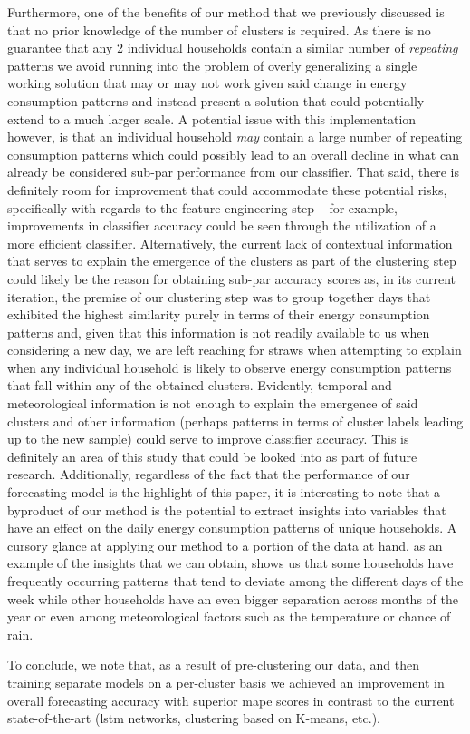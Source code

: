 \noindent \newline Furthermore, one of the benefits of our method that we previously discussed is that no prior knowledge of the number of clusters is required. As there is no guarantee that any 2 individual households contain a similar number of \textit{repeating} patterns we avoid running into the problem of overly generalizing a single working solution that may or may not work given said change in energy consumption patterns and instead present a solution that could potentially extend to a much larger scale. A potential issue with this implementation however, is that an individual household \textit{may} contain a large number of repeating consumption patterns which could possibly lead to an overall decline in what can already be considered sub-par performance from our classifier. That said, there is definitely room for improvement that could accommodate these potential risks, specifically with regards to the feature engineering step -- for example, improvements in classifier accuracy could be seen through the utilization of a more efficient classifier. Alternatively, the current lack of contextual information that serves to explain the emergence of the clusters as part of the clustering step could likely be the reason for obtaining sub-par accuracy scores as, in its current iteration, the premise of our clustering step was to group together days that exhibited the highest similarity purely in terms of their energy consumption patterns and, given that this information is not readily available to us when considering a new day, we are left reaching for straws when attempting to explain when any individual household is likely to observe energy consumption patterns that fall within any of the obtained clusters. Evidently, temporal and meteorological information is not enough to explain the emergence of said clusters and other information (perhaps patterns in terms of cluster labels leading up to the new sample) could serve to improve classifier accuracy. This is definitely an area of this study that could be looked into as part of future research. Additionally, regardless of the fact that the performance of our forecasting model is the highlight of this paper, it is interesting to note that a byproduct of our method is the potential to extract insights into variables that have an effect on the daily energy consumption patterns of unique households. A cursory glance at applying our method to a portion of the data at hand, as an example of the insights that we can obtain, shows us that some households have frequently occurring patterns that tend to deviate among the different days of the week while other households have an even bigger separation across months of the year or even among meteorological factors such as the temperature or chance of rain.

\noindent \newline To conclude, we note that, as a result of pre-clustering our data, and then training separate models on a per-cluster basis we achieved an improvement in overall forecasting accuracy with superior \gls{mape} scores in contrast to the current state-of-the-art (\gls{lstm} networks, clustering based on K-means, etc.).